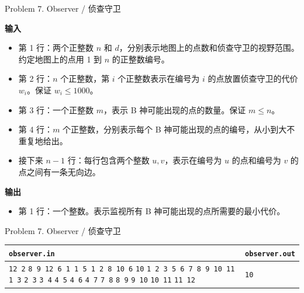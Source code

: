 \documentclass[UTF8]{beamer}
\begin{document}
\begin{frame}{Problem 7. Observer / 侦查守卫}

\textbf{输入}
\begin{itemize}
    \item 第 1 行：两个正整数 $n$ 和 $d$，分别表示地图上的点数和侦查守卫的视野范围。
                    约定地图上的点用 1 到 $n$ 的正整数编号。
    \item 第 2 行：$n$ 个正整数，第 $i$ 个正整数表示在编号为 $i$ 的点放置侦查守卫的代价 $w_i$。保证 $w_i \leq 1000$。
    \item 第 3 行：一个正整数 $m$，表示 B 神可能出现的点的数量。保证 $m \leq n$。
    \item 第 4 行：$m$ 个正整数，分别表示每个 B 神可能出现的点的编号，从小到大不重复地给出。
    \item 接下来 $n - 1$ 行：每行包含两个整数 $u, v$，表示在编号为 $u$ 的点和编号为 $v$ 的点之间有一条无向边。
\end{itemize}
\textbf{输出}
\begin{itemize}
    \item 第 1 行：一个整数。表示监视所有 B 神可能出现的点所需要的最小代价。
\end{itemize}

\end{frame}

\begin{frame}{Problem 7. Observer / 侦查守卫}
\small{
\begin{tabularx}{\textwidth}{|X|X|}
\hline
\texttt{\textbf{observer.in}} & \texttt{\textbf{observer.out}} \\ \hline
\texttt{12 2}\newline
\texttt{8 9 12 6 1 1 5 1 2 8 10 6}\newline
\texttt{10}\newline
\texttt{1 2 3 5 6 7 8 9 10 11}\newline
\texttt{1 3}\newline
\texttt{2 3}\newline
\texttt{3 4}\newline
\texttt{4 5}\newline
\texttt{4 6}\newline
\texttt{4 7}\newline
\texttt{7 8}\newline
\texttt{8 9}\newline
\texttt{9 10}\newline
\texttt{10 11}\newline
\texttt{11 12}
&
\texttt{10}
\\ \hline
\end{tabularx}
}
\newline

\end{frame}
\end{document}
